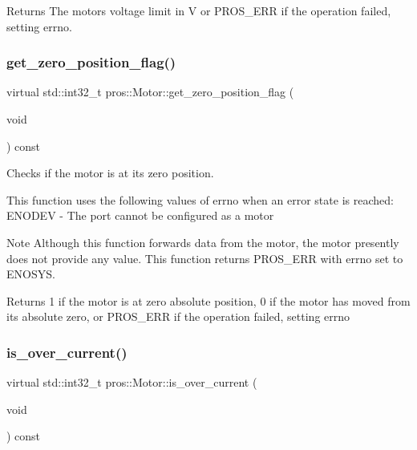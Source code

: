 \begin{DoxyReturn}{Returns}
The motor\textquotesingle{}s voltage limit in V or P\+R\+O\+S\+\_\+\+E\+RR if the operation failed, setting errno. 
\end{DoxyReturn}
\mbox{\label{classpros_1_1Motor_a589a3cbb397ba065c30c1f16bb3f08a7}} 
\subsubsection{\texorpdfstring{get\+\_\+zero\+\_\+position\+\_\+flag()}{get\_zero\_position\_flag()}}
{\footnotesize\ttfamily virtual std\+::int32\+\_\+t pros\+::\+Motor\+::get\+\_\+zero\+\_\+position\+\_\+flag (\begin{DoxyParamCaption}\item[{void}]{ }\end{DoxyParamCaption}) const\hspace{0.3cm}{\ttfamily [virtual]}}



Checks if the motor is at its zero position. 

This function uses the following values of errno when an error state is reached\+: E\+N\+O\+D\+EV -\/ The port cannot be configured as a motor

\begin{DoxyNote}{Note}
Although this function forwards data from the motor, the motor presently does not provide any value. This function returns P\+R\+O\+S\+\_\+\+E\+RR with errno set to E\+N\+O\+S\+YS.
\end{DoxyNote}
\begin{DoxyReturn}{Returns}
1 if the motor is at zero absolute position, 0 if the motor has moved from its absolute zero, or P\+R\+O\+S\+\_\+\+E\+RR if the operation failed, setting errno 
\end{DoxyReturn}
\mbox{\label{classpros_1_1Motor_a2d34c92effccfbb4d2f45319bf4bd272}} 
\subsubsection{\texorpdfstring{is\+\_\+over\+\_\+current()}{is\_over\_current()}}
{\footnotesize\ttfamily virtual std\+::int32\+\_\+t pros\+::\+Motor\+::is\+\_\+over\+\_\+current (\begin{DoxyParamCaption}\item[{void}]{ }\end{DoxyParamCaption}) const\hspace{0.3cm}{\ttfamily [virtual]}}



